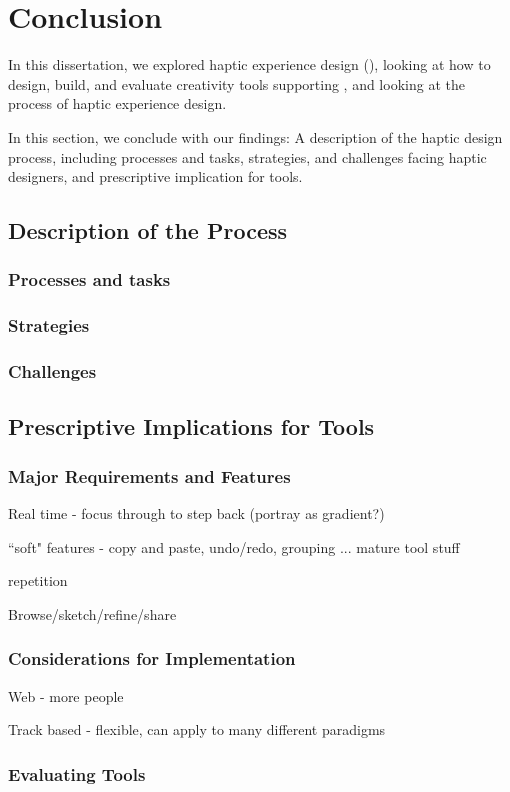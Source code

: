 
\chapter{Conclusion}
\label{ch:conclusion}

In this dissertation, we explored haptic experience design (\haxd), looking at how to design, build, and evaluate creativity tools supporting \haxd, and looking at the process of haptic experience design.

In this section, we conclude with our findings: A description of the haptic design process, including processes and tasks, strategies, and challenges facing haptic designers, and prescriptive implication for \haxd tools.

\section{Description of the \haxd Process}

\subsection{Processes and tasks}

\subsection{Strategies}

\subsection{Challenges}




\section{Prescriptive Implications for \haxd Tools}

\subsection{Major Requirements and Features}

Real time - focus through to step back (portray as gradient?)

``soft" features - copy and paste, undo/redo, grouping ... mature tool stuff

repetition

Browse/sketch/refine/share


\subsection{Considerations for Implementation}

Web - more people

Track based - flexible, can apply to many different paradigms




\subsection{Evaluating \haxd Tools}



\endinput
